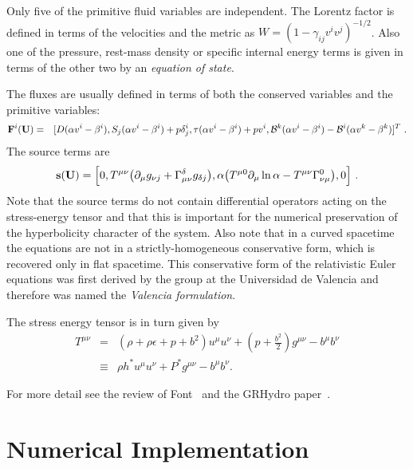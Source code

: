 \documentclass{article}
\begin{document}
Only five of the primitive fluid variables are
independent. The Lorentz factor is defined in terms of the
velocities and the metric as $W = (1-\gamma_{ij}v^i v^j)^{-1/2}$.  
Also one of the pressure, rest-mass density or specific internal energy terms is given in 
terms of the other two by an {\it equation of state}.

The fluxes are usually defined in terms of both the conserved
variables and the primitive variables:
%
\begin{eqnarray}
{\bf F}^i({\bf U}) &=& [D(\alpha v^i - \beta^i), S_j(\alpha v^i -
  \beta^i) + p\delta^i_j, \tau(\alpha v^i - \beta^i) + p
  v^i, \mathcal B^k (\alpha v^i - \beta^i) - \mathcal B^i (\alpha v^k - \beta^k)]^T\ .
\end{eqnarray}
%
The source terms are
%
\begin{eqnarray} \label{source_terms}
{\bf s}({\bf U}) = \Big [0, T^{\mu\nu}\big (\partial_\mu g_{\nu j} +
  \Gamma^\delta_{\mu\nu} g_{\delta j}\big ), \alpha \big (T^{\mu
    0}\partial_\mu \ln \alpha - T^{\mu\nu}\Gamma^0_{\nu\mu} \big), 0 \Big ]\ .
\end{eqnarray}
%
Note that the source terms do not contain differential operators
acting on the stress-energy tensor and that this is important for the
numerical preservation of the hyperbolicity character of the system.
Also note that in a curved spacetime the equations are not in a
strictly-homogeneous conservative form, which is recovered only in flat
spacetime. This conservative form of the relativistic Euler equations
was first derived by the group at the Universidad de Valencia
\cite{Banyuls97} and therefore was named the {\it Valencia
formulation}. 

The stress energy tensor is in turn given by
\begin{eqnarray}
T^{\mu \nu}
  &=&  \left( \rho +  \rho \epsilon + p + b^2 \right) u^\mu u^\nu +
       \left(p + \frac{b^2}{2} \right) g^{\mu \nu} - b^\mu b^\nu
  \\\nonumber
  &\equiv& \rho h^*u^\mu u^\nu + P^* g^{\mu \nu} -
           b^\mu b^\nu.  \label{mhd-stress-energy-tensor}
\end{eqnarray}



For more detail see the review of Font~\cite{livrevgrrfd} and the GRHydro
paper~\cite{Moesta:2013dna}.

\section{Numerical Implementation}
\end{document}
